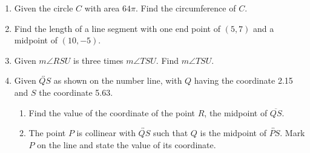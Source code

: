 \documentclass[12pt, oneside]{article}
\begin{document}
\begin{enumerate}
  \item Given the circle $C$ with area $64\pi$. Find the circumference of $C$. \vspace{4cm}

  \item Find the length of a line segment with one end point of $(5,7)$ and a midpoint of $(10, -5)$. \vspace{5cm}

\newpage
  \item Given $m\angle RSU$ is three times $m\angle TSU$. Find $m\angle TSU$.\\[1cm]
\vspace{3cm}

  \item Given $\overleftrightarrow{QS}$ as shown on the number line, with $Q$ having the coordinate 2.15 and $S$ the coordinate 5.63. \\[20pt] %
     \bigskip
    \begin{enumerate}
      \item Find the value of the coordinate of the point $R$, the midpoint of $\overline{QS}$. \vspace{4cm}
      \item The point $P$ is collinear with $\overleftrightarrow{QS}$ such that $Q$ is the midpoint of $\overleftrightarrow{PS}$. Mark $P$ on the line and state the value of its coordinate.
    \end{enumerate}\vspace{4cm}



\end{enumerate}
\end{document}
